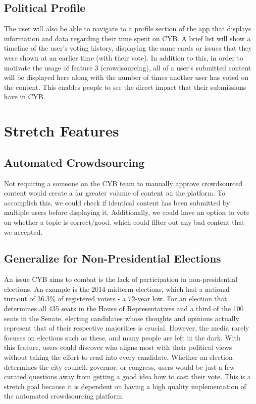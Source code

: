 \documentclass[11pt]{article}
\begin{document}
\subsection{Political Profile}

The user will also be able to navigate to a profile section of the app that displays information and data regarding their time spent on CYB. A brief list will show a timeline of the user's voting history, displaying the same cards or issues that they were shown at an earlier time (with their vote). In addition to this, in order to motivate the usage of feature 3 (crowdsourcing), all of a user's submitted content will be displayed here along with the number of times another user has voted on the content. This enables people to see the direct impact that their submissions have in CYB. 

\section*{Stretch Features}

\subsection{Automated Crowdsourcing}

Not requiring a someone on the CYB team to manually approve crowdsourced content would create a far greater volume of content on the platform. To accomplish this, we could check if identical content has been submitted by multiple users before displaying it. Additionally, we could have an option to vote on whether a topic is correct/good, which could filter out any bad content that we accepted.

\subsection{Generalize for Non-Presidential Elections}

An issue CYB aims to combat is the lack of participation in non-presidential elections. An example is the 2014 midterm elections, which had a national turnout of 36.3\% of registered voters - a 72-year low. For an election that determines all 435 seats in the House of Representatives and a third of the 100 seats in the Senate, electing candidates whose thoughts and opinions actually represent that of their respective majorities is crucial. However, the media rarely focuses on elections such as these, and many people are left in the dark. With this feature, users could discover who aligns most with their political views without taking the effort to read into every candidate. Whether an election determines the city council, governor, or congress, users would be just a few curated questions away from getting a good idea how to cast their vote. This is a stretch goal because it is dependent on having a high quality implementation of the automated crowdsourcing platform.
\end{document}
